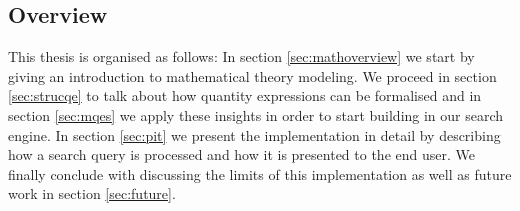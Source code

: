

\subsection{Overview}

This thesis is organised as follows: In section \ref{sec:mathoverview} we start by giving an introduction to mathematical theory modeling. We proceed in section \ref{sec:strucqe} to talk about how quantity expressions can be formalised and in section \ref{sec:mqes} we apply these insights in order to start building in our search engine. In section \ref{sec:pit} we present the implementation in detail by describing how a search query is processed and how it is presented to the end user. We finally conclude with discussing the limits of this implementation as well as future work in section \ref{sec:future}.
